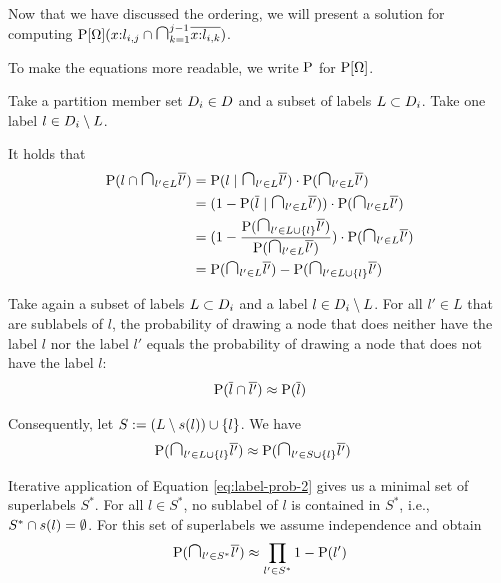 Now that we have discussed the ordering, we will present a solution for
computing
$\prob{\Omega}(x{:}l_{i,j}
       \isect \bigisect_{k=1}^{j-1} \overline{x{:}l_{i,k}})$.

To make the equations more readable, we write $\operatorname{P}$ for $\operatorname{P}[\Omega]$.

Take a partition member set $D_i \in D$ and a subset of labels
$L \subset D_i$. Take one label $l \in D_i \setminus L$.

It holds that
\begin{align}
\begin{split}
  \sprob(l \isect \bigisect_{l' \in L} \overline{l'})
    &= \sprob(l \mid \bigisect_{l' \in L} \overline{l'})
       \cdot \sprob(\bigisect_{l' \in L} \overline{l'}) \\
    &= (1 - \sprob(\overline{l} \mid \bigisect_{l' \in L} \overline{l'}))
       \cdot \sprob(\bigisect_{l' \in L} \overline{l'}) \\
    &= (1 - \frac{\sprob(\bigisect_{l' \in L \union \{l\}} \overline{l'})}
                 {\sprob(\bigisect_{l' \in L} \overline{l'})})
       \cdot \sprob(\bigisect_{l' \in L} \overline{l'}) \\
    &= \sprob(\bigisect_{l' \in L} \overline{l'})
       - \sprob(\bigisect_{l' \in L \union \{l\}} \overline{l'})
    \label{eq:label-prob-1}
\end{split}
\end{align}

Take again a subset of labels $L \subset D_i$ and a label
$l \in D_i \setminus L$. For all $l' \in L$ that are sublabels
of $l$, the probability of drawing a node that does neither have the label
$l$ nor the label $l'$ equals the probability of drawing a node that does
not have the label $l$:
\begin{align*}
  \operatorname{P}(\overline{l} \cap \overline{l'}) \approx \operatorname{P}(\overline{l})
\end{align*}

Consequently, let $S := (L \setminus s(l)) \cup \{l\}$. We have
\begin{align}
\begin{split}
  \sprob(\bigisect_{l' \in L \union \{l\}} \overline{l'})
    &\approx \sprob(\bigisect_{l' \in S \union \{l\}} \overline{l'})
    \label{eq:label-prob-2}
\end{split}
\end{align}

Iterative application of Equation \ref{eq:label-prob-2} gives us a minimal
set of superlabels $S^*$. For all $l \in S^*$, no sublabel of $l$ is contained
in $S^*$, i.e., $S^* \cap s(l) = \emptyset$.
For this set of superlabels we assume independence and obtain
\begin{align}
  \sprob(\bigisect_{l' \in S^*} \overline{l'})
    \approx \prod_{l' \in S^*} 1 - \sprob(l')
  \label{eq:label-prob-3}
\end{align}

